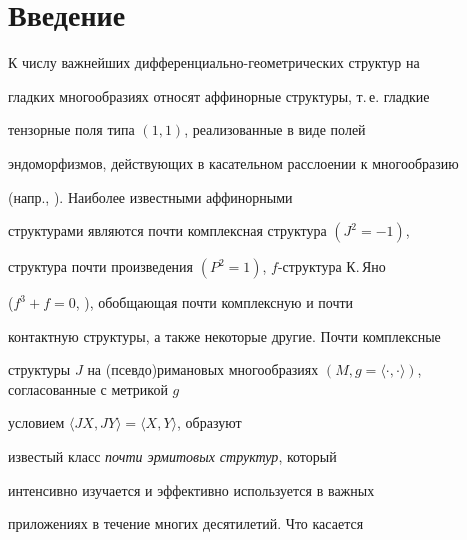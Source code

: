\date{}




\pagestyle{plain} %







\maketitle


\label{begin}








\section{Введение}





К числу важнейших дифференциально-геометрических структур на


гладких многообразиях относят аффинорные структуры, т.\,е. гладкие


тензорные поля типа $(1,1)$, реализованные в виде полей


эндоморфизмов, действующих в касательном расслоении к многообразию


(напр., \cite{1}). Наиболее известными аффинорными


структурами являются почти комплексная структура $(J^2=-1)$,


структура почти произведения $(P^2=1)$, $f$-структура К.\,Яно


($f^3+f=0$, \cite{2}), обобщающая почти комплексную и почти


контактную структуры, а также некоторые другие. Почти комплексные


структуры $J$ на (псевдо)римановых многообразиях $(M,


g=\langle\cdot,\cdot\rangle)$, согласованные с метрикой $g$


условием $\langle JX, JY\rangle=\langle X, Y\rangle$, образуют


известый класс {\it почти эрмитовых структур}, который


интенсивно изучается и эффективно используется в важных


приложениях в течение многих десятилетий. Что касается


